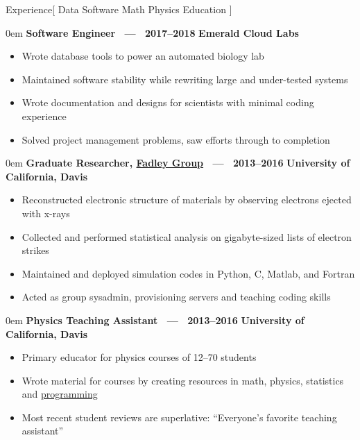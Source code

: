 \documentclass[11pt,a4paper]{article}
\newenvironment{headedsection}[2]{
    \begin{addmargin}[0.5em]{0em}
    {\large\bfseries #1} \hfill {\bfseries #2}%
    \begin{itemize}
        [label={}, topsep=0pt, itemsep=1.5pt, parsep=0pt, leftmargin=1.5em]
}{
    \end{itemize}
    \end{addmargin}
    \medskip
}
\begin{document}
\sloppy  %


\vspace{1em}

\begin{mysection}{Experience}[
    Data 
    \textbullet{} Software
    \textbullet{} Math
    \textbullet{} Physics
    \textbullet{} Education
]

    \begin{headedsection}
        {Software Engineer \ --- \ 2017--2018}{Emerald Cloud Labs}

        \item Wrote database tools to power an automated biology lab
        \item Maintained software stability while rewriting large and
            under-tested systems
        \item Wrote documentation and designs for scientists with minimal coding experience
        \item Solved project management problems, saw efforts through to
            completion
    \end{headedsection}

    \begin{headedsection}
          {Graduate Researcher, \href{http://www.physics.ucdavis.edu/fadleygroup/}{Fadley Group}
             \ --- \ 2013--2016}
          {University of California, Davis}

        \item Reconstructed electronic structure of materials by observing
            electrons ejected with x-rays
        \item Collected and performed statistical analysis on gigabyte-sized
            lists of electron strikes
        \item Maintained and deployed simulation codes in Python, C, Matlab,
            and Fortran
        \item Acted as group sysadmin, provisioning servers and teaching coding
             skills
    \end{headedsection}

    \begin{headedsection}
          {Physics Teaching Assistant  \ --- \ 2013--2016}
          {University of California, Davis}

        \item Primary educator for physics courses of 12--70 students
        \item Wrote material for courses by creating resources in math, physics,
            statistics and
            \href{https://github.com/jgarst/AdvancedLab/releases/download/spring_2016/Python-FirstSteps.pdf}
                {programming}
        \item Most recent student reviews are superlative:
            ``Everyone's favorite teaching assistant''
    \end{headedsection}


\end{mysection}
\end{document}
